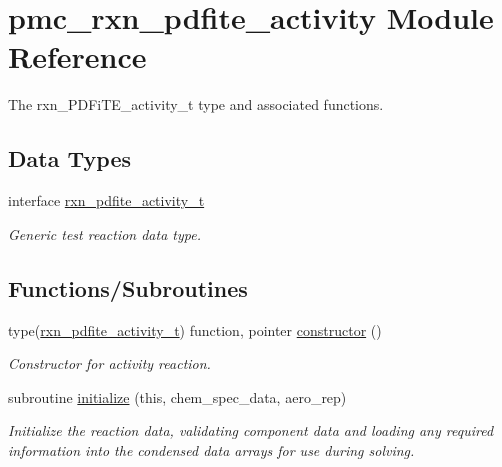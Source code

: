 \hypertarget{namespacepmc__rxn__pdfite__activity}{}\section{pmc\+\_\+rxn\+\_\+pdfite\+\_\+activity Module Reference}
\label{namespacepmc__rxn__pdfite__activity}


The rxn\+\_\+\+P\+D\+Fi\+T\+E\+\_\+activity\+\_\+t type and associated functions.  


\subsection*{Data Types}
\begin{DoxyCompactItemize}
\item 
interface \mbox{\hyperlink{structpmc__rxn__pdfite__activity_1_1rxn__pdfite__activity__t}{rxn\+\_\+pdfite\+\_\+activity\+\_\+t}}
\begin{DoxyCompactList}\small\item\em Generic test reaction data type. \end{DoxyCompactList}\end{DoxyCompactItemize}
\subsection*{Functions/\+Subroutines}
\begin{DoxyCompactItemize}
\item 
type(\mbox{\hyperlink{structpmc__rxn__pdfite__activity_1_1rxn__pdfite__activity__t}{rxn\+\_\+pdfite\+\_\+activity\+\_\+t}}) function, pointer \mbox{\hyperlink{namespacepmc__rxn__pdfite__activity_a3c0413f9ba4125dfa77c0c1e88b847a1}{constructor}} ()
\begin{DoxyCompactList}\small\item\em Constructor for activity reaction. \end{DoxyCompactList}\item 
subroutine \mbox{\hyperlink{namespacepmc__rxn__pdfite__activity_aabaa82aa9a7850318a120845b3fd8512}{initialize}} (this, chem\+\_\+spec\+\_\+data, aero\+\_\+rep)
\begin{DoxyCompactList}\small\item\em Initialize the reaction data, validating component data and loading any required information into the condensed data arrays for use during solving. \end{DoxyCompactList}\end{DoxyCompactItemize}


